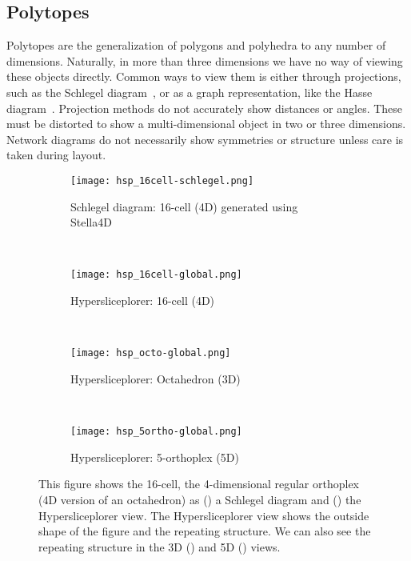 \subsection{Polytopes}
\label{sec:polytopes}

Polytopes are the
generalization of polygons and polyhedra to any number of dimensions.
Naturally, in more than three dimensions we have no way of viewing these
objects directly. Common ways to view them is either through
projections, such as the Schlegel diagram~\cite{Sommerville:1929}, or as a
graph representation, like the Hasse diagram~\cite{Battista:1988}. Projection
methods do not accurately show distances or angles. These must be distorted to
show a multi-dimensional object in two or three dimensions. Network diagrams do
not necessarily show symmetries or structure unless care is taken during
layout.

\begin{figure} 
  \centering
  \begin{subfigure}[b]{0.45\linewidth}
    \texttt{[image: hsp\_16cell-schlegel.png]}
    \caption{Schlegel diagram: 16-cell (4D) generated using Stella4D~\cite{Stella4D}}
    \label{fig:ortho:schlegel} 
  \end{subfigure} 
  ~
  \begin{subfigure}[b]{0.45\linewidth}
    \texttt{[image: hsp\_16cell-global.png]}
    \caption{Hypersliceplorer: 16-cell (4D)}
    \label{fig:ortho:4} 
  \end{subfigure}
  \\
  \begin{subfigure}[b]{0.45\linewidth}
    \texttt{[image: hsp\_octo-global.png]}
    \caption{Hypersliceplorer: Octahedron (3D)}
    \label{fig:ortho:3} 
  \end{subfigure}
  ~
  \begin{subfigure}[b]{0.45\linewidth}
    \texttt{[image: hsp\_5ortho-global.png]}
    \caption{Hypersliceplorer: 5-orthoplex (5D)}
    \label{fig:ortho:5} 
  \end{subfigure} 
  \caption{%
    This figure shows the 16-cell, the 4-dimensional regular orthoplex (4D 
    version of
    an octahedron) as () a Schlegel diagram and
    () the Hypersliceplorer view. The Hypersliceplorer
    view shows the outside shape of the figure and the repeating structure.
    We can also see the repeating structure in the 3D ()
    and 5D () views.
  } 
  \label{fig:orthos} 
\end{figure}

